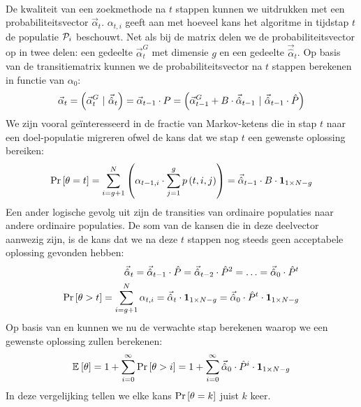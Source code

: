 \paragraph{}
De kwaliteit van een zoekmethode na $t$ stappen kunnen we uitdrukken met een probabiliteitsvector $\vec{\alpha}_t$. $\alpha_{t,i}$ geeft aan met hoeveel kans het algoritme in tijdstap $t$ de populatie $\PopSet_i$ beschouwt. Net als bij de matrix delen we de probabiliteitsvector op in twee delen: een gedeelte $\vec{\alpha}^G_t$ met dimensie $g$ en een gedeelte $\vec{\hat{\alpha}}_t$. Op basis van de transitiematrix kunnen we de probabiliteitsvector na $t$ stappen berekenen in functie van $\alpha_0$:
\begin{equation}
\vec{\alpha}_t=\brak{\vec{\alpha}_t^G\ |\ \vec{\hat{\alpha}}_t}=\vec{\alpha}_{t-1}\cdot P=\brak{\vec{\alpha}_{t-1}^G+B\cdot\vec{\hat{\alpha}}_{t-1}\ |\ \vec{\hat{\alpha}}_{t-1}\cdot\hat{P}}
\eqnlab{oneStepTransition}
\end{equation}
We zijn vooral ge\"interesseerd in de fractie van Markov-ketens die in stap $t$ naar een doel-populatie migreren ofwel de kans dat we stap $t$ een gewenste oplossing bereiken:
\begin{equation}
\Prob{\theta=t}=\displaystyle\sum_{i=g+1}^{N}\brak{\alpha_{t-1,i}\cdot\displaystyle\sum_{j=1}^{g}\fun{p}{t,i,j}}=\vec{\hat{\alpha}}_{t-1}\cdot B\cdot\onematrix[1\times N-g]
\eqnlab{exhaust}
\end{equation}
Een ander logische gevolg uit  zijn de transities van ordinaire populaties naar andere ordinaire populaties. De som van de kansen die in deze deelvector aanwezig zijn, is de kans dat we na deze $t$ stappen nog steeds geen acceptabele oplossing gevonden hebben:
\begin{eqnarray}
\vec{\hat{\alpha}}_t=\vec{\hat{\alpha}}_{t-1}\cdot\hat{P}=\vec{\hat{\alpha}}_{t-2}\cdot\hat{P}^2=\ldots=\vec{\hat{\alpha}}_{0}\cdot\hat{P}^t\eqnlab{remainder}\\
\Prob{\theta>t}=\displaystyle\sum_{i=g+1}^{N}\alpha_{t,i}=\vec{\hat{\alpha}}_t\cdot\onematrix[1\times N-g]=\vec{\hat{\alpha}}_{0}\cdot\hat{P}^t\cdot\onematrix[1\times N-g]\eqnlab{nothit}
\end{eqnarray}
Op basis van  en  kunnen we nu de verwachte stap berekenen waarop we een gewenste oplossing zullen berekenen:
\begin{equation}
\mean{\theta}=1+\displaystyle\sum_{i=0}^{\infty}{\Prob{\theta>i}}=1+\displaystyle\sum_{i=0}^{\infty}{\vec{\hat{\alpha}}_{0}\cdot\hat{P}^i\cdot\onematrix[1\times N-g]}
\end{equation}
In deze vergelijking tellen we elke kans $\Prob{\theta=k}$ juist $k$ keer.
